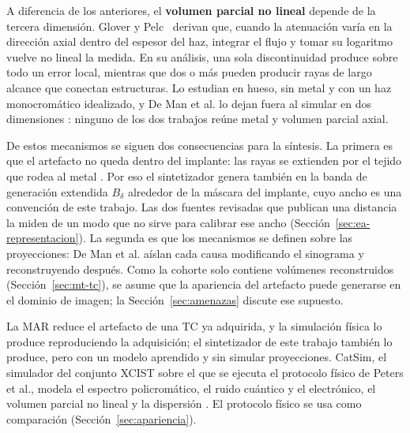 A diferencia de los anteriores, el \textbf{volumen parcial no lineal} depende de la tercera dimensión. Glover y Pelc~\cite{glover1980nonlinear} derivan que, cuando la atenuación varía en la dirección axial dentro del espesor del haz, integrar el flujo y tomar su logaritmo vuelve no lineal la medida. En su análisis, una sola discontinuidad produce sobre todo un error local, mientras que dos o más pueden producir rayas de largo alcance que conectan estructuras. Lo estudian en hueso, sin metal y con un haz monocromático idealizado, y De Man et al. lo dejan fuera al simular en dos dimensiones \cite{deman1999}: ninguno de los dos trabajos reúne metal y volumen parcial axial.

De estos mecanismos se siguen dos consecuencias para la síntesis. La primera es que el artefacto no queda dentro del implante: las rayas se extienden por el tejido que rodea al metal \cite{deman1999,park2015ct}. Por eso el sintetizador genera también en la banda de generación extendida $B_{\delta}$ alrededor de la máscara del implante, cuyo ancho es una convención de este trabajo. Las dos fuentes revisadas que publican una distancia la miden de un modo que no sirve para calibrar ese ancho (Sección~\ref{sec:ea-representacion}). La segunda es que los mecanismos se definen sobre las proyecciones: De Man et al. aíslan cada causa modificando el sinograma y reconstruyendo después. Como la cohorte solo contiene volúmenes reconstruidos (Sección~\ref{sec:mt-tc}), se asume que la apariencia del artefacto puede generarse en el dominio de imagen; la Sección~\ref{sec:amenazas} discute ese supuesto.

La MAR reduce el artefacto de una TC ya adquirida, y la simulación física lo produce reproduciendo la adquisición; el sintetizador de este trabajo también lo produce, pero con un modelo aprendido y sin simular proyecciones. CatSim, el simulador del conjunto XCIST \cite{wu2022xcist} sobre el que se ejecuta el protocolo físico de Peters et al., modela el espectro policromático, el ruido cuántico y el electrónico, el volumen parcial no lineal y la dispersión \cite{deman2007catsim}. El protocolo físico se usa como comparación (Sección~\ref{sec:apariencia}).

